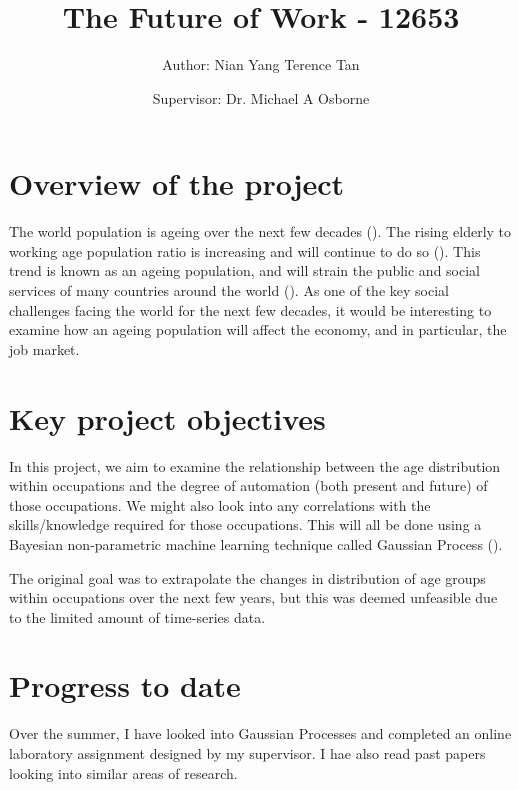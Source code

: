 \documentclass[11pt]{article}
\title{The Future of Work - 12653}
\author{Author: Nian Yang Terence Tan \and Supervisor: Dr. Michael A Osborne}
\begin{document}
\maketitle


\section{Overview of the project}
The world population is ageing over the next few decades (\cite{science}). The rising elderly to working age population ratio is increasing and will continue to do so (\cite{WHO}). This trend is known as an ageing population, and will strain the public and social services of many countries around the world (\cite{publicservicesstrain}). As one of the key social challenges facing the world for the next few decades, it would be interesting to examine how an ageing population will affect the economy, and in particular, the job market.

\section{Key project objectives}
In this project, we aim to examine the relationship between the age distribution within occupations and the degree of automation (both present and future) of those occupations. We might also look into any correlations with the skills/knowledge required for those occupations. This will all be done using a Bayesian non-parametric machine learning technique called Gaussian Process (\cite{GaussianProcess}).

The original goal was to extrapolate the changes in distribution of age groups within occupations over the next few years, but this was deemed unfeasible due to the limited amount of time-series data.

  
\section{Progress to date}
Over the summer, I have looked into Gaussian Processes and completed an online laboratory assignment designed by my supervisor. I hae also read past papers looking into similar areas of research.
\end{document}

